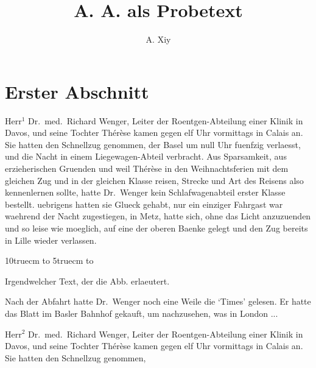 %
\setlength{\textwidth}{1.2\textwidth}
\setlength{\textheight}{1.1\textheight}
%
\sloppy
\parindent=0pt
%

\initfloatingfigs%
%
\author{A. Xiy}
\title{A. A. als Probetext}
\maketitle
%
\tableofcontents
\listoffigures
%
\section{Erster Abschnitt}
Herr$^{1}$ Dr.~med.~Richard Wenger, Leiter der Roent\-gen-Ab\-tei\-lung
einer Klinik in Davos, und seine
Tochter Th\'e\-r\`ese kamen gegen elf Uhr vormittags
in Calais an. Sie hatten den Schnellzug genommen,
der Basel um null Uhr fuenfzig verlaesst, und die
Nacht in einem Liege\-wagen-Abteil verbracht.
Aus Sparsamkeit, aus erzieherischen
Gruenden und weil
Th\'e\-r\`ese in den Weihnachtsferien mit dem gleichen
Zug und in der gleichen Klasse reisen, Strecke und
Art des Reisens also kennenlernen sollte, hatte Dr.~Wenger
kein Schlafwagenabteil erster Klasse bestellt.
uebrigens hatten sie Glueck gehabt, nur ein
einziger Fahrgast war waehrend der Nacht zugestiegen,
in Metz, hatte sich, ohne das Licht anzuzuenden
und so leise wie moeglich, auf eine der oberen
Baenke gelegt und den Zug bereits in Lille wieder
verlassen.\par
\begin{floatingfigure}{10truecm}
%
\vbox to 5truecm{\vfil
                 \hbox to %
                 \vfil}
%
\caption{Irgendwelcher Text, der die Abb. erlaeutert.}
\end{floatingfigure}
%
Nach der Abfahrt hatte Dr.~Wen\-ger noch eine
Weile die `Times' gelesen. Er hatte das Blatt im
Basler Bahnhof gekauft, um nachzusehen, was in London ...\par
Herr$^{2}$ Dr.~med.~Richard Wenger, Leiter der Roent\-gen-Ab\-tei\-lung
einer Klinik in Davos, und seine
Tochter Th\'e\-r\`ese kamen gegen elf Uhr vormittags
in Calais an. Sie hatten den Schnellzug genommen,
